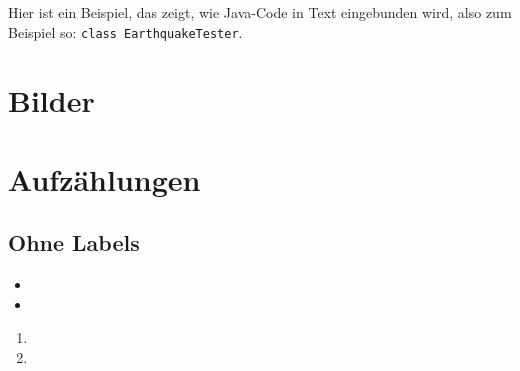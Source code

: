 \documentclass[bibtotoc,halfparskip,oneside]{scrreprt}
\begin{document}
Hier ist ein Beispiel, das zeigt, wie Java-Code in Text eingebunden wird, also zum Beispiel so: \lstinline[style=javastyle]$class EarthquakeTester$.



\lipsum[1]


\section{Bilder}

\lipsum[1-3]


\section{Aufzählungen}

\lipsum[1]

\subsection{Ohne Labels}

\lipsum[1]

\begin{itemize}
	\item \lipsum[3]
	\item \lipsum[3]
\end{itemize}

\lipsum[1]

\begin{enumerate}
	\item \lipsum[3]
	\item \lipsum[3]
\end{enumerate}
\end{document}
